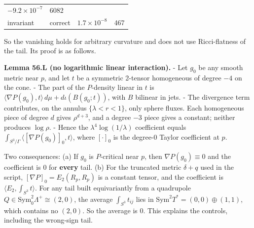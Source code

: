 \documentclass[
  10pt,
]{report}
\begin{document}
\begin{longtable}[]{@{}llll@{}}
\begin{minipage}[t]{0.22\columnwidth}
\(-9.2\times10^{-7}\)\strut
\end{minipage} & \begin{minipage}[t]{0.22\columnwidth}\raggedright
6082\strut
\end{minipage}\tabularnewline
\begin{minipage}[t]{0.22\columnwidth}\raggedright
invariant\strut
\end{minipage} & \begin{minipage}[t]{0.22\columnwidth}\raggedright
correct\strut
\end{minipage} & \begin{minipage}[t]{0.22\columnwidth}\raggedright
\(1.7\times10^{-8}\)\strut
\end{minipage} & \begin{minipage}[t]{0.22\columnwidth}\raggedright
467\strut
\end{minipage}\tabularnewline
\bottomrule
\end{longtable}

So the vanishing holds for arbitrary curvature and does not use
Ricci-flatness of the tail. Its proof is as follows.

\textbf{Lemma 56.L (no logarithmic linear interaction).} - Let \(g_0\)
be any smooth metric near \(p\), and let \(t\) be a symmetric 2-tensor
homogeneous of degree \(-4\) on the cone. - The part of the
\(P\)-density linear in \(t\) is
\(\langle\nabla P(g_0),t\rangle\,d\mu+d\iota(B(g_0;t))\), with \(B\)
bilinear in jets. - The divergence term contributes, on the annulus
\(\{\lambda<r<1\}\), only sphere fluxes. Each homogeneous piece of
degree \(d\) gives \(\rho^{d+3}\), and a degree \(-3\) piece gives a
constant; neither produces \(\log\rho\). - Hence the
\(\lambda^4\log(1/\lambda)\) coefficient equals
\(\int_{S^3/\Gamma}\langle[\nabla P(g_0)]_0,t\rangle\), where
\([\cdot]_0\) is the degree-0 Taylor coefficient at \(p\).

Two consequences: (a) If \(g_0\) is \(P\)-critical near \(p\), then
\(\nabla P(g_0)\equiv0\) and the coefficient is \(0\) for \textbf{every}
tail. (b) For the truncated metric \(\delta+q\) used in the script,
\([\nabla P]_0=E_2(R_p,R_p)\) is a constant tensor, and the coefficient
is \(\langle E_2,\int_{S^3}t\rangle\). For any tail built equivariantly
from a quadrupole \(Q\in\mathrm{Sym}^2_0\Lambda^+\cong(2,0)\), the
average \(\int_{S^3}t_{ij}\) lies in
\(\mathrm{Sym}^2T^*=(0,0)\oplus(1,1)\), which contains no \((2,0)\). So
the average is \(0\). This explains the controls, including the
wrong-sign tail.
\end{document}
